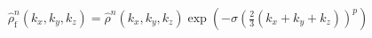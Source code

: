 \begin{equation}\label{eq:poussins_filter}
  \hat{\rho}_\text{f}^n(k_x, k_y, k_z) =
    \hat{\rho}^n(k_x, k_y, k_z)
    \exp(-\sigma\left(\tfrac23(k_x + k_y + k_z)\right)^p)
\end{equation}
